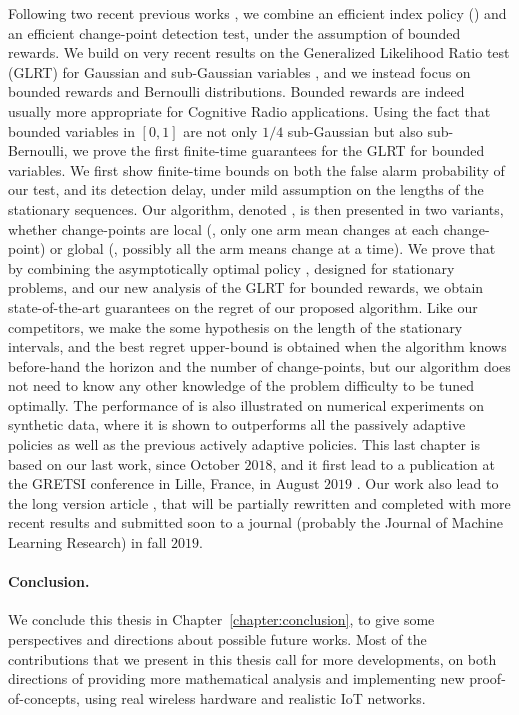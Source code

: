 Following two recent previous works \cite{LiuLeeShroff17,CaoZhenKvetonXie18}, we combine an efficient index policy (\klUCB) and an efficient change-point detection test, under the assumption of bounded rewards.
We build on very recent results on the Generalized Likelihood Ratio test (GLRT) for Gaussian and sub-Gaussian variables \cite{Maillard2018GLR}, and we instead focus on bounded rewards and Bernoulli distributions.
Bounded rewards are indeed usually more appropriate for Cognitive Radio applications.
Using the fact that bounded variables in $[0,1]$ are not only $1/4$ sub-Gaussian but also sub-Bernoulli, we prove the first finite-time guarantees for the GLRT for bounded variables.
We first show finite-time bounds on both the false alarm probability of our test, and its detection delay, under mild assumption on the lengths of the stationary sequences.
Our algorithm, denoted \GLRklUCB, is then presented in two variants, whether change-points are local (\ie, only one arm mean changes at each change-point) or global (\ie, possibly all the arm means change at a time).
%
We prove that by combining the asymptotically optimal policy \klUCB, designed for stationary problems, and our new analysis of the GLRT for bounded rewards, we obtain state-of-the-art guarantees on the regret of our proposed algorithm.
Like our competitors, we make the some hypothesis on the length of the stationary intervals, and the best regret upper-bound is obtained when the algorithm knows before-hand the horizon and the number of change-points, but our algorithm does not need to know any other knowledge of the problem difficulty to be tuned optimally.
%
The performance of \GLRklUCB{} is also illustrated on numerical experiments on synthetic data, where it is shown to outperforms all the passively adaptive policies as well as the previous actively adaptive policies.
%
This last chapter is based on our last work, since October $2018$, and it first lead to a publication at the GRETSI conference in Lille, France, in August $2019$ \cite{Besson2019Gretsi}.
Our work also lead to the long version article \cite{Besson2019GLRT}, that will be partially rewritten and completed with more recent results and submitted soon to a journal (probably the Journal of Machine Learning Research) in fall $2019$.


\paragraph{Conclusion.}
%
We conclude this thesis in Chapter~\ref{chapter:conclusion}, to give some perspectives and directions about possible future works.
Most of the contributions that we present in this thesis call for more developments, on both directions of providing more mathematical analysis and implementing new proof-of-concepts, using real wireless hardware and realistic IoT networks.

